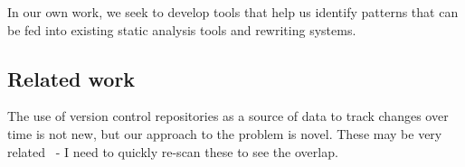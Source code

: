 
In our own work, we seek to develop tools that help us identify patterns that
can be fed into existing static analysis tools and rewriting systems.

\subsection{Related work}

The use of version control repositories as a source of data to track changes
over time is not new, but our approach to the problem is novel. 
These may be very
related~\cite{weissgerber06identify, kim07automatic, neamtiu05understand} - I
need to quickly re-scan these to see the overlap.  
